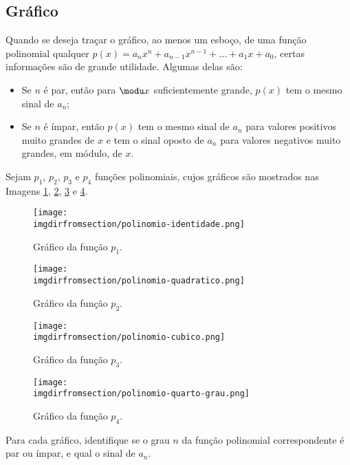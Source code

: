 \subsection{Gráfico}
\label{sec:grafico-funcao-polinomial}

Quando se deseja traçar o gráfico, ao menos um esboço, de uma função polinomial qualquer 
$p(x) = a_n x^n+ a_{n-1} x^{n-1} + \dots + a_1x + a_0$, certas informações são de grande utilidade. 
Algumas delas são:
%
\begin{itemize}
  \item Se $n$ é par, então para $\modu x $ suficientemente grande,
  $p(x)$ tem o mesmo sinal de $a_n$;
  \item Se $n$ é ímpar, então $p(x)$ tem o mesmo sinal de $a_n$ para
  valores positivos  muito grandes de $x$ e tem o sinal oposto de
  $a_n$ para valores negativos muito grandes, em módulo, de $x$.
\end{itemize}

\begin{example}
Sejam $p_1$, $p_2$, $p_3$ e $p_4$ funções polinomiais, cujos gráficos são mostrados nas Imagens
\ref{fig:polinomio-identidade}, \ref{fig:polinomio-quadratico}, \ref{fig:polinomio-cubico} e \ref{fig:polinomio-quartico}.

\begin{figure}[H]
  \centering
  \texttt{[image: \\imgdirfromsection/polinomio-identidade.png]}
  \caption{Gráfico da função $p_1$.}
  \label{fig:polinomio-identidade}
\end{figure}

\begin{figure}[H]
  \centering
  \texttt{[image: \\imgdirfromsection/polinomio-quadratico.png]}
  \caption{Gráfico da função $p_2$.}
  \label{fig:polinomio-quadratico}
\end{figure}

\begin{figure}[H]
  \centering
  \texttt{[image: \\imgdirfromsection/polinomio-cubico.png]}
  \caption{Gráfico da função $p_3$.}
  \label{fig:polinomio-cubico}
\end{figure}

\begin{figure}[H]
  \centering
  \texttt{[image: \\imgdirfromsection/polinomio-quarto-grau.png]}
  \caption{Gráfico da função $p_4$.}
  \label{fig:polinomio-quartico}
\end{figure}

Para cada gráfico, identifique se o grau $n$ da função polinomial correspondente é par ou ímpar, e qual o sinal 
de $a_n$.
\end{example}

